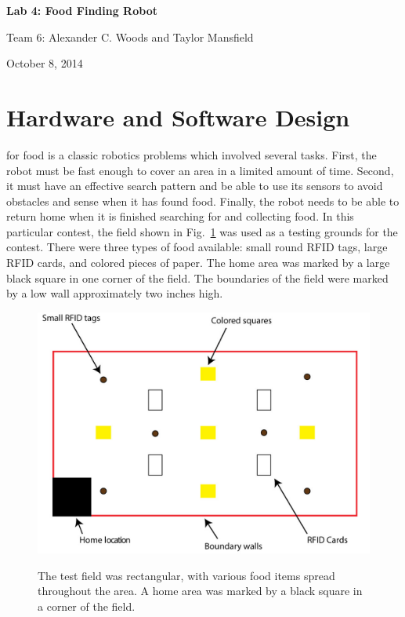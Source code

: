 \documentclass[journal]{IEEEtran}
\begin{document}
\begin{titlepage}
    \vspace*{\fill}
    \begin{center}
      {\LARGE \bf Lab 4: Food Finding Robot}
      
      {Team 6: Alexander  C. Woods and Taylor Mansfield}
      
      October 8, 2014
    \end{center}
    \vspace*{\fill}
  \end{titlepage}
  

\section{Hardware and Software Design}\label{S.design}
 for food is a classic robotics problems which involved several tasks. First, the robot must be fast enough to cover an area in a limited amount of time. Second, it must have an effective search pattern and be able to use its sensors to avoid obstacles and sense when it has found food. Finally, the robot needs to be able to return home when it is finished searching for and collecting food. In this particular contest, the field shown in Fig.~\ref{F.field} was used as a testing grounds for the contest. There were three types of food available: small round RFID tags, large RFID cards, and colored pieces of paper. The home area was marked by a large black square in one corner of the field. The boundaries of the field were marked by a low wall approximately two inches high. 

\begin{figure}[h]
 \centering
  \includegraphics[width=1\columnwidth]{field.jpg}\\
  \caption{The test field was rectangular, with various food items spread throughout the area. A home area was marked by a black square in a corner of the field.}
  \label{F.field}
\end{figure}
\end{document}
